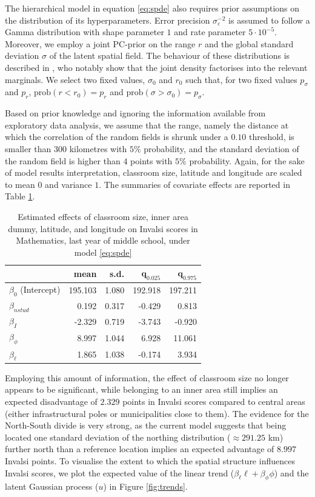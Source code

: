 \documentclass[openany, 11pt, oneside]{book}
\begin{document}
The hierarchical model in equation \ref{eq:spde} also requires prior assumptions on the distribution of its hyperparameters. Error precision $\sigma_{\varepsilon}^{-2}$ is assumed to follow a Gamma distribution with shape parameter $1$ and rate parameter $ 5 \cdot 10^{-5}$. Moreover, we employ a joint PC-prior on the range $r$ and the global standard deviation $\sigma$ of the latent spatial field. The behaviour of these distributions is described in \cite{SPDEPC}, who notably show that the joint density factorises into the relevant marginals. We select two fixed values, $\sigma_0$ and $r_0$ such that, for two fixed values $p_\sigma$ and $p_r$, $\mathrm{prob} \left( r < r_0 \right) = p_r $ and $\mathrm{prob} \left( \sigma > \sigma_0 \right) = p_\sigma$. 

Based on prior knowledge and ignoring the information available from exploratory data analysis, we assume that the range, namely the distance at which the correlation of the random fields is shrunk under a $0.10$ threshold, is smaller than $300$ kilometres with $5\%$ probability, and the standard deviation of the random field is higher than $4$ points with $5\%$ probability. Again, for the sake of model results interpretation, classroom size, latitude and longitude are scaled to mean $0$ and variance $1$.  The summaries of covariate effects are reported in Table \ref{tab:betaSP}.
%
 \begin{table}
 \centering
\begin{tabular}{lrrrr}
 & mean & s.d. & $\boldsymbol{q}_{0.025}$ & $\boldsymbol{q}_{0.975}$ \\
 \hline
 $\beta_0$ (Intercept) & 195.103 & 1.080 & 192.918 & 197.211 \\  
 $\beta_{nstud}$ &0.192 & 0.317 & -0.429 & 0.813 \\ 
 $\beta_I$ & -2.329 & 0.719 & -3.743 & -0.920 \\ 
 $\beta_{\phi}$ & 8.997 & 1.044 & 6.928 & 11.061 \\ 
 $\beta_{\ell}$ &  1.865 & 1.038 & -0.174 & 3.934 \\ 
 \hline
\end{tabular}
  \captionsetup{width=0.9\textwidth}
\caption{Estimated effects of classroom size, inner area dummy, latitude, and longitude on Invalsi scores in Mathematics, last year of middle school, under model \ref{eq:spde}}
\label{tab:betaSP}
\end{table}
%
Employing this amount of information, the effect of classroom size no longer appears to be significant, while belonging to an inner area still implies an expected disadvantage of $2.329 $ points in Invalsi scores compared to central areas (either infrastructural poles or municipalities close to them). The evidence for the North-South divide is very strong, as the current model suggests that being located one standard deviation of the northing distribution ($\approx 291.25$ km) further north than a reference location implies an expected advantage of $8.997$ Invalsi points. To visualise the extent to which the spatial structure influences Invalsi scores, we plot the expected value of the linear trend ($\beta_\ell \ell + \beta_\phi \phi$) and the latent Gaussian process ($u$) in Figure \ref{fig:trends}.
\end{document}
